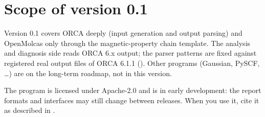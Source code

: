 \section{Scope of version 0.1}

Version 0.1 covers ORCA deeply (input generation and output parsing) and
OpenMolcas only through the magnetic-property chain template. The analysis and
diagnosis side reads ORCA 6.x output; the parser patterns are fixed against
registered real output files of ORCA 6.1.1 (). Other
programs (Gaussian, PySCF, \dots) are on the long-term roadmap, not in this
version.

The program is licensed under Apache-2.0 and is in early development: the
report formats and interfaces may still change between releases. When you use
it, cite it as described in .
